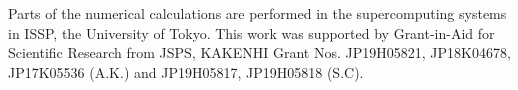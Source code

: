 \documentclass[aps,twocolumn,pra,superscriptaddress,amsmath,amssymb]{revtex4-1}
\begin{document}
\begin{acknowledgments}
  Parts of the numerical calculations are performed
  in the supercomputing systems in ISSP, the University of Tokyo.
  This work was supported by Grant-in-Aid for Scientific Research from
  JSPS, KAKENHI Grant Nos.
  JP19H05821, JP18K04678, JP17K05536 (A.K.) and JP19H05817, JP19H05818 (S.C).
\end{acknowledgments}



\end{document}
